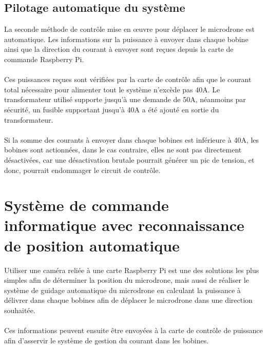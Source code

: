 \documentclass{article}
\begin{document}
    \subsection{Pilotage automatique du système}
        La seconde méthode de contrôle mise en œuvre pour déplacer le microdrone est automatique. Les informations sur la puissance à envoyer dans chaque bobine ainsi que la direction du courant à envoyer sont reçues depuis la carte de commande Raspberry Pi.
        \\\\
        Ces puissances reçues sont vérifiées par la carte de contrôle afin que le courant total nécessaire pour alimenter tout le système n'excède pas 40A. Le transformateur utilisé supporte jusqu'à une demande de 50A, néanmoins par sécurité, un fusible supportant jusqu'à 40A a été ajouté en sortie du transformateur.
        \\\\
        Si la somme des courants à envoyer dans chaque bobines est inférieure à 40A, les bobines sont actionnées, dans le cas contraire, elles ne sont pas directement désactivées, car une désactivation brutale pourrait générer un pic de tension, et donc, pourrait endommager le circuit de contrôle.

\section{Système de commande informatique avec reconnaissance de position automatique}
\label{Système de commande informatique}
    Utiliser une caméra reliée à une carte Raspberry Pi est une des solutions les plus simples afin de déterminer la position du microdrone, mais aussi de réaliser le système de guidage automatique du microdrone en calculant la puissance à délivrer dans chaque bobines afin de déplacer le microdrone dans une direction souhaitée.
    \\\\
    Ces informations peuvent ensuite être envoyées à la carte de contrôle de puissance afin d'asservir le système de gestion du courant dans les bobines.
\end{document}
